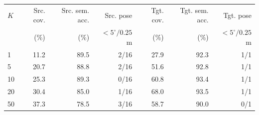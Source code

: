 \begin{tabular}{lrrrrrr}
\toprule
$K$ & Src. cov. & Src. sem. acc. & Src. pose & Tgt. cov. & Tgt. sem. acc. & Tgt. pose \\
 & (\%) & (\%) & $<5^\circ/0.25$m & (\%) & (\%) & $<5^\circ/0.25$m \\
\midrule
1 & 11.2 & 89.5 & 2/16 & 27.9 & 92.3 & 1/1 \\
5 & 20.7 & 88.8 & 2/16 & 51.6 & 92.8 & 1/1 \\
10 & 25.3 & 89.3 & 0/16 & 60.8 & 93.4 & 1/1 \\
20 & 30.4 & 85.0 & 1/16 & 68.0 & 93.5 & 1/1 \\
50 & 37.3 & 78.5 & 3/16 & 58.7 & 90.0 & 0/1 \\
\bottomrule
\end{tabular}
